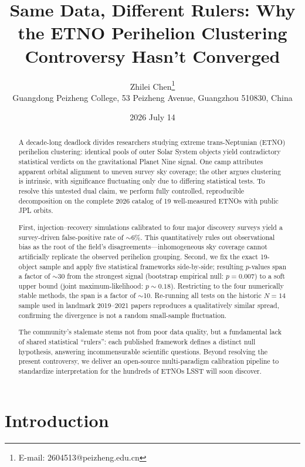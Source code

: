 \documentclass[12pt,a4paper]{article}
\title{Same Data, Different Rulers: Why the ETNO Perihelion Clustering Controversy Hasn't Converged}
\author{Zhilei Chen\thanks{E-mail: 2604513@peizheng.edu.cn} \\
Guangdong Peizheng College, 53 Peizheng Avenue, Guangzhou 510830, China}
\date{2026 July 14}
\begin{document}
\maketitle

\begin{abstract}
A decade-long deadlock divides researchers studying extreme trans-Neptunian (ETNO) perihelion clustering: identical pools of outer Solar System objects yield contradictory statistical verdicts on the gravitational Planet Nine signal. One camp attributes apparent orbital alignment to uneven survey sky coverage; the other argues clustering is intrinsic, with significance fluctuating only due to differing statistical tests. To resolve this untested dual claim, we perform fully controlled, reproducible decomposition on the complete 2026 catalog of 19 well-measured ETNOs with public JPL orbits.

First, injection--recovery simulations calibrated to four major discovery surveys yield a survey-driven false-positive rate of $\sim$6\%. This quantitatively rules out observational bias as the root of the field's disagreements---inhomogeneous sky coverage cannot artificially replicate the observed perihelion grouping. Second, we fix the exact 19-object sample and apply five statistical frameworks side-by-side; resulting $p$-values span a factor of $\sim$30 from the strongest signal (bootstrap empirical null: $p=0.007$) to a soft upper bound (joint maximum-likelihood: $p\sim0.18$). Restricting to the four numerically stable methods, the span is a factor of $\sim$10. Re-running all tests on the historic $N=14$ sample used in landmark 2019--2021 papers reproduces a qualitatively similar spread, confirming the divergence is not a random small-sample fluctuation.

The community's stalemate stems not from poor data quality, but a fundamental lack of shared statistical ``rulers'': each published framework defines a distinct null hypothesis, answering incommensurable scientific questions. Beyond resolving the present controversy, we deliver an open-source multi-paradigm calibration pipeline to standardize interpretation for the hundreds of ETNOs LSST will soon discover.
\end{abstract}

\section{Introduction}
\end{document}
